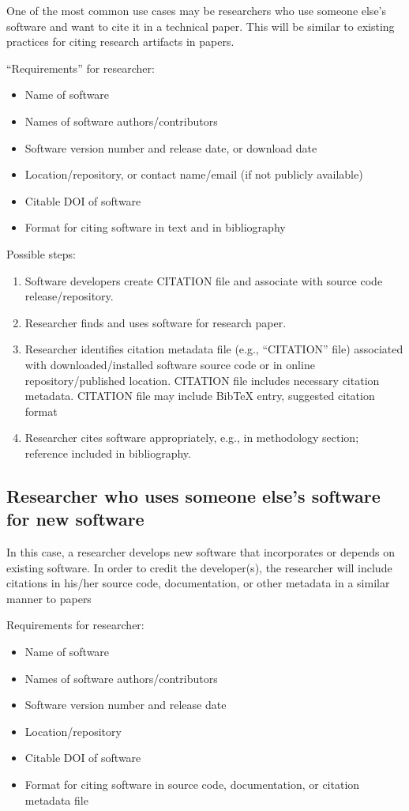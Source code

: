\documentclass[12pt, oneside]{amsart}
\begin{document}
One of the most common use cases may be researchers who use someone else's software and want to cite it in a technical paper.
This will be similar to existing practices for citing research artifacts in papers.

``Requirements'' for researcher:
\begin{itemize}
\item Name of software
\item Names of software authors/contributors
\item Software version number and release date, or download date
\item Location/repository, or contact name/email (if not publicly available)
\item Citable DOI of software
\item Format for citing software in text and in bibliography
\end{itemize}

Possible steps:
\begin{enumerate} \setcounter{enumi}{0}
\item Software developers create CITATION file and associate with source code release/repository.
\item Researcher finds and uses software for research paper.
\item Researcher identifies citation metadata file (e.g., ``CITATION'' file) associated with downloaded/installed software source code or in online repository/published location. CITATION file includes necessary citation metadata. CITATION file may include BibTeX entry, suggested citation format
\item Researcher cites software appropriately, e.g., in methodology section; reference included in bibliography.
\end{enumerate}

\subsection{Researcher who uses someone else's software for new software}

In this case, a researcher develops new software that incorporates or depends on existing software.
In order to credit the developer(s), the researcher will include citations in his/her source code, documentation, or other metadata in a similar manner to papers

Requirements for researcher:
\begin{itemize}
\item Name of software
\item Names of software authors/contributors
\item Software version number and release date
\item Location/repository
\item Citable DOI of software
\item Format for citing software in source code, documentation, or citation metadata file
\end{itemize}
\end{document}
